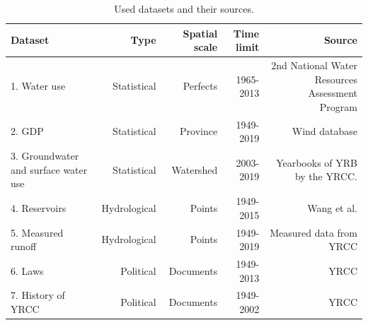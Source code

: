 \documentclass[9pt,twoside,lineno]{pnas-new}
\begin{document}







\begin{table}\centering
    \caption{Used datasets and their sources.}
    
    \begin{tabular}{lrrrr}
    Dataset & Type & Spatial scale & Time limit & Source \\
    \midrule
    1. Water use & Statistical & Perfects & 1965-2013 & 2nd National Water Resources Assessment Program \\
    2. GDP & Statistical & Province & 1949-2019 & Wind database \\
    3. Groundwater and surface water use & Statistical & Watershed & 2003-2019 & Yearbooks of YRB by the YRCC. \\
    4. Reservoirs & Hydrological & Points & 1949-2015 & Wang et al. \cite{wangYellowRiverWater2019} \\
    5. Measured runoff & Hydrological & Points & 1949-2019 & Measured data from YRCC \\
    6. Laws & Political & Documents & 1949-2013 & YRCC \cite{yellowriverconservancycommissionYellowRiverBasin2013} \\
    7. History of YRCC & Political & Documents & 1949-2002 & YRCC \cite{ yellowriverarchivesOrganizationalHistoryYellow2004} \\
    \bottomrule
    \end{tabular}
\end{table}
\end{document}
